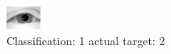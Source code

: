 \begin{figure}[h!]
\begin{center}
\includegraphics[width=0.60\columnwidth]{figures/ID2278_class_1_target_2.png}
\end{center}
\caption{ Classification: 1 actual target: 2}
\label{fig:ID2278_class_1_target_2}
\end{figure}

